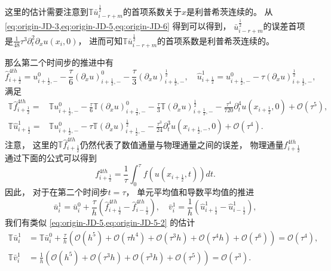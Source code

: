 这里的估计需要注意到${\mathbb{T}}\bar u_{i-r+m}^{\frac 12}$的首项系数关于$x$是利普希茨连续的。
从 \cref{eq:origin-JD-3,eq:origin-JD-5,eq:origin-JD-6} 得到可以得到，
$\bar u_{i-r+m}^{\frac 12}$的误差首项是$\frac{1}{48}\tau^3{\partial_{t}^2\partial_{x}} u(x_i,0)$，
进而可知${\mathbb{T}}\bar u_{i-r+m}^{\frac 12}$的首项系数是利普希茨连续的。

那么第二个时间步的推进中有
\begin{equation}
  \label{eq:origin-JD-9}
  \hat{f}^{4th}_{i+\frac 12} = u_{i+\frac{1}{2},-}^{0} - \frac\tau6\left({\partial_x}u\right)_{i+\frac{1}{2},-}^{0} - \frac\tau3\left({\partial_x}u\right)_{i+\frac{1}{2},-}^{\frac12},\quad
  \hat{u}^{1}_{i+\frac12} = u_{i+\frac{1}{2},-}^{0} - \tau\left({\partial_x}u\right)_{i+\frac{1}{2},-}^{\frac{1}{2}},
\end{equation}
满足
\begin{align}
  \label{eq:origin-JD-10}
  {\mathbb{T}}\hat{f}^{4th}_{i+\frac 12} =
   & {\mathbb{T}} u_{i+\frac{1}{2},-}^{0}-\frac\tau6 {\mathbb{T}} \left({\partial_{x}} u\right)_{i+\frac 12,-}^{0}-\frac\tau3 {\mathbb{T}} \left({\partial_{x}} u\right)_{i+\frac 12,-}^{\frac{1}{2}} - \frac{\tau^4}{720} {\partial_{t}^4} u(x_{i+\frac 12},0)+{\mathcal{O}}(\tau^5), \\
  {\mathbb{T}}\hat {u}^{1}_{i+\frac 12} =
   & {\mathbb{T}} u_{i+\frac{1}{2},-}^{0}-\tau {\mathbb{T}} \left({\partial_{x}} u\right)_{i+\frac 12,-}^{\frac{1}{2}} - \frac{\tau^3}{24}{\partial_{t}^3} u(x_{i+\frac 12,-}, 0)+{\mathcal{O}}(\tau^4).
\end{align}
注意，
这里的${\mathbb{T}}\hat{f}^{4th}_{i+\frac 12}$仍然代表了数值通量与物理通量之间的误差，
物理通量$f_{i+\frac 12}^{4th}$通过下面的公式可以得到
\begin{equation}
  f_{i+\frac 12}^{4th} = \frac{1}{\tau}\int_{0}^{\tau} f(u(x_{i+\frac 12},t)) dt.
\end{equation}
因此，
对于在第二个时间步$t=\tau$，
单元平均值和导数平均值的推进
\begin{equation}
  \label{eq:origin-JD-11}
  \bar u_{i}^{1} = \bar u_{i}^{0} + \frac{\tau}{h} \left(\hat{f}^{4th}_{i+\frac 12}-\hat{f}^{4th}_{i-\frac 12}\right), \quad
  \bar v_{i}^{1} = \frac{1}{h} \left(\hat {u}^{1}_{i+\frac 12}-\hat {u}^{1}_{i-\frac 12}\right),
\end{equation}
我们有类似 \cref{eq:origin-JD-5,eq:origin-JD-5-2} 的估计
\begin{align}
  \label{eq:origin-JD-12}
  {\mathbb{T}} \bar u_{i}^{1} & = {\mathbb{T}} \bar u_{i}^{0} + \frac{\tau}{h} \left(\mathcal{O}(h^5)+\mathcal{O}(\tau h^4)+\mathcal{O}(\tau^3 h)+\mathcal{O}(\tau^4 h)+\mathcal{O}(\tau^6)\right) = {\mathcal{O}}(\tau^4), \\
  {\mathbb{T}} \bar v_{i}^{1} & = \frac{1}{h}\left({\mathcal{O}}(h^5) + {\mathcal{O}}(\tau^3 h) + {\mathcal{O}}(\tau^3 h) + {\mathcal{O}}(\tau^5)\right) = {\mathcal{O}}(\tau^3).
\end{align}

